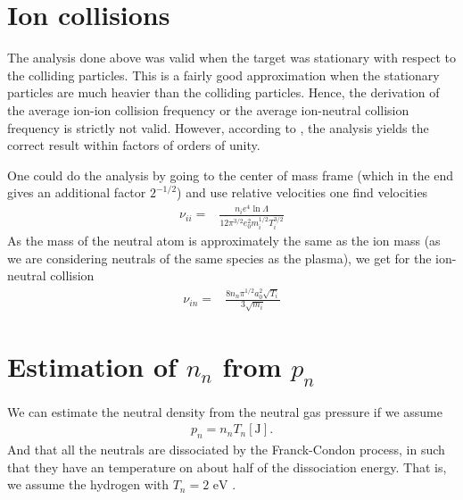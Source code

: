 \section{Ion collisions}
\label{sec:nui}
%
The analysis done above was valid when the target was stationary with respect to the colliding particles.
This is a fairly good approximation when the stationary particles are much heavier than the colliding particles.
Hence, the derivation of the average ion-ion collision frequency or the average ion-neutral collision frequency is strictly not valid.
However, according to \cite{Goldston1995book}, the analysis yields the correct result within factors of orders of unity.

One could do the analysis by going to the center of mass frame (which in the end gives an additional factor $2^{-1/2}$) and use relative velocities one find velocities
%
\begin{align*}
    \nu_{ii}
    =&
    \frac{n_ie^4\ln\Lambda}{12\pi^{3/2}e_0^2m_i^{1/2}T_i^{3/2}}
\end{align*}
%
As the mass of the neutral atom is approximately the same as the ion mass (as we are considering neutrals of the same species as the plasma), we get for the ion-neutral collision
%
\begin{align*}
    \nu_{in}
    =&
    \frac{8 n_n\pi^{1/2} a_0^2 \sqrt{T_i}}{3\sqrt{m_i}}
\end{align*}

\section{Estimation of \texorpdfstring{$n_n$}{the neutral density} from \texorpdfstring{$p_n$}{the neutral pressure}}
We can estimate the neutral density from the neutral gas pressure if we assume
%
\begin{align*}
    p_n = n_nT_{n}[\text{J}].
\end{align*}
%
And that all the neutrals are dissociated by the Franck-Condon process, in such that they have an temperature on about half of the dissociation energy.
That is, we assume the hydrogen with $T_n = 2 \text{ eV}$ \cite{Stangeby2000book,Janev1987book}.

